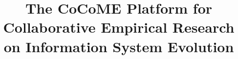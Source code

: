 \documentclass[runningheads]{llncs}
\title{The CoCoME Platform for Collaborative Empirical Research on Information System Evolution}
\author{}%
\institute{Institute for Program Structures and Data Organization}
\newcommand{\nocontentsline}[3]{}
\newcommand{\tocless}[2]{\bgroup\let\addcontentsline=\nocontentsline#1{#2}\egroup}
\begin{document}
\tocless\maketitle	
	
\tableofcontents









\end{document}
